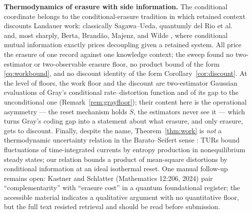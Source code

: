 \documentclass[11pt]{article}
\begin{document}
\textbf{Thermodynamics of erasure with side information.} The conditional
coordinate belongs to the conditional-erasure tradition in which retained
context discounts Landauer work: classically Sagawa--Ueda, quantumly del
Rio et al.\ \cite{delrio2011} and, most sharply, Berta, Brand\~ao, Majenz,
and Wilde \cite{bbmw2018}, where conditional mutual information exactly
prices decoupling given a retained system. All price the erasure of one
record against one knowledge context; the sweep found no two-estimator or
two-observable erasure floor, no product bound of the form
\eqref{eq:workbound}, and no discount identity of the form
Corollary~\ref{cor:discount}. At the level of floors, the work floor and the
discount are two-estimator Gaussian evaluations of Gray's conditional
rate--distortion function and of its gap to the unconditional one
\cite{gray1973} (Remark~\ref{rem:grayfloor}); their content here is
the operational asymmetry --- the reset mechanism holds $S$, the estimators
never see it --- which turns Gray's coding gap into a statement about what
erasure, and only erasure, gets to discount. Finally, despite the name,
Theorem~\ref{thm:work} is \emph{not} a thermodynamic uncertainty relation
in the Barato--Seifert sense \cite{baratoseifert2015}: TURs bound
fluctuations of time-integrated currents by entropy production in
nonequilibrium steady states; our relation bounds a product of mean-square
distortions by conditional information at an ideal isothermal reset. One
manual follow-up remains open: Kastner and Schlatter (Mathematics 12:206,
2024) pair ``complementarity'' with ``erasure cost'' in a quantum
foundational register; the accessible material indicates a qualitative
argument with no quantitative floor, but the full text resisted retrieval
and should be read before submission.
\end{document}
